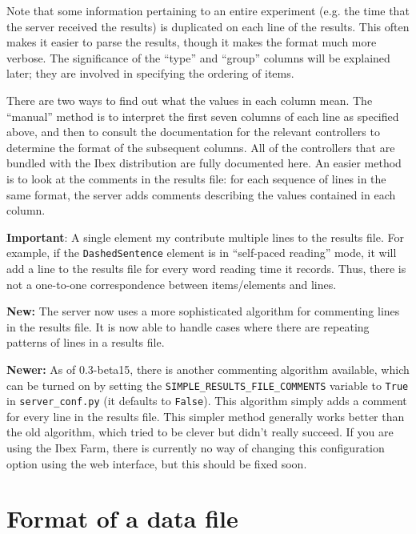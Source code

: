 \documentclass[11pt,letterpaper]{article}
\begin{document}
Note that some information pertaining to an entire experiment (e.g. the time
that the server received the results) is
duplicated on each line of the results. This often makes it easier to parse the
results, though it makes the format much more verbose.  The significance of the
``type'' and ``group'' columns will be explained later; they are involved in
specifying the ordering of items.

There are two ways to find out what the values in each column mean.  The
``manual'' method is to interpret the first seven columns of each line as
specified above, and then to consult the documentation for the relevant
controllers to determine the format of the subsequent columns. All of the
controllers that are bundled with the Ibex distribution are fully documented
here.  An easier method is to look at the comments in the results file: for
each sequence of lines in the same format, the server adds comments describing
the values contained in each column.

\textbf{Important}: A single element my contribute multiple lines to the results file.
For example, if the \texttt{DashedSentence} element is in ``self-paced reading'' mode, it
will add a line to the results file for every word reading time it
records. Thus, there is not a one-to-one correspondence between items/elements
and lines.

\textbf{New:} The server now uses a more sophisticated algorithm for commenting lines in
the results file. It is now able to handle cases where there are repeating
patterns of lines in a results file.

\textbf{Newer:} As of 0.3-beta15, there is another commenting algorithm
available, which can be turned on by setting the
\texttt{SIMPLE\_RESULTS\_FILE\_COMMENTS} variable to \texttt{True} in \texttt{server\_conf.py}
(it defaults to \texttt{False}). This algorithm simply adds a comment for
every line in the results file. This simpler method generally works
better than the old algorithm, which tried to be clever but didn't
really succeed. If you are using the Ibex Farm, there is currently
no way of changing this configuration option using the web interface,
but this should be fixed soon.

\section{Format of a data file}
\end{document}
